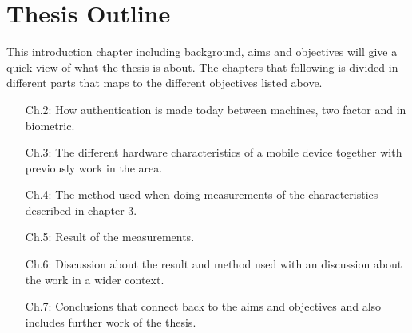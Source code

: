 \section{Thesis Outline}\label{sec:outline}
This introduction chapter including background, aims and objectives will give a quick view of what the thesis is about. The chapters that following is divided in different parts that maps to the different objectives listed above.
\begin{itemize}
	\item[Ch.2:]	How authentication is made today between machines, two factor and in biometric.
	\item[Ch.3:]	The different hardware characteristics of a mobile device together with previously work in the area.
	\item[Ch.4:]	The method used when doing measurements of the characteristics described in chapter 3.
	\item[Ch.5:]	Result of the measurements.
	\item[Ch.6:]	Discussion about the result and method used with an discussion about the work in a wider context.
	\item[Ch.7:]	Conclusions that connect back to the aims and objectives and also includes further work of the thesis.
\end{itemize}